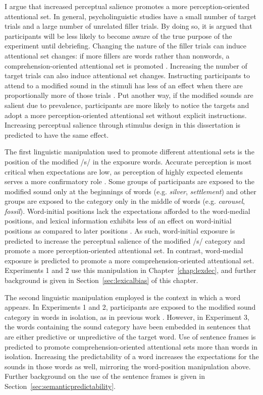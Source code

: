 I argue that increased perceptual salience promotes a more perception-oriented attentional set.
In general, psycholinguistic studies have a small number of target trials and a large number of unrelated filler trials.
By doing so, it is argued that participants will be less likely to become aware of the true purpose of the experiment until debriefing.
Changing the nature of the filler trials can induce attentional set changes: if more fillers are words rather than nonwords, a comprehension-oriented attentional set is promoted \citep{Mirman2008}.
Increasing the number of target trials can also induce attentional set changes.
Instructing participants to attend to a modified sound in the stimuli has less of an effect when there are proportionally more of those trials \citep{Pitt2012}.
Put another way, if the modified sounds are salient due to prevalence, participants are more likely to notice the targets and adopt a more perception-oriented attentional set without explicit instructions.
Increasing perceptual salience through stimulus design in this dissertation is predicted to have the same effect.

The first linguistic manipulation used to promote different attentional sets is the position of the modified /s/ in the exposure words.  
Accurate perception is most critical when expectations are low, as perception of highly expected elements serves a more confirmatory role \citep{Marslen-Wilson1978, Gow1995}.
Some groups of participants are exposed to the modified sound only at the beginnings of words (e.g. \emph{silver}, \emph{settlement}) and other groups are exposed to the category only in the middle of words (e.g. \emph{carousel}, \emph{fossil}).
Word-initial positions lack the expectations afforded to the word-medial positions, and lexical information exhibits less of an effect on word-initial positions as compared to later positions \citep{Pitt2006}.
As such, word-initial exposure is predicted to increase the perceptual salience of the modified /s/ category and promote a more perception-oriented attentional set.
In contrast, word-medial exposure is predicted to promote a more comprehension-oriented attentional set.
Experiments 1 and 2 use this manipulation in Chapter~\ref{chap:lexdec}, and further background is given in Section~\ref{sec:lexicalbias} of this chapter.

The second linguistic manipulation employed is the context in which a word appears.  
In Experiments 1 and 2, participants are exposed to the modified sound category in words in isolation, as in previous work \citep{Norris2003}.  
However, in Experiment 3, the words containing the sound category have been embedded in sentences that are either predictive or unpredictive of the target word.
Use of sentence frames is predicted to promote comprehension-oriented attentional sets more than words in isolation.
Increasing the predictability of a word increases the expectations for the sounds in those words as well, mirroring the word-position manipulation above.
Further background on the use of the sentence frames is given in Section~\ref{sec:semanticpredictability}.

